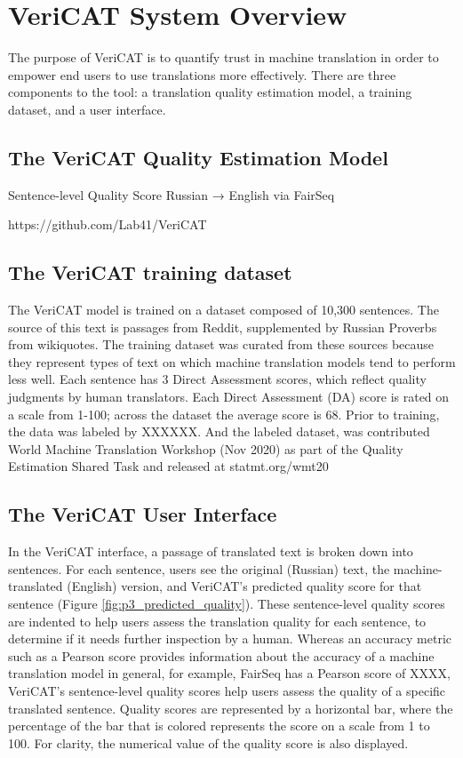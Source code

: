 \section{VeriCAT System Overview}
The purpose of VeriCAT is to quantify trust in machine translation in order to empower end users to use translations more effectively. There are three components to the tool: a  translation quality estimation model, a training dataset, and a user interface.

\subsection{The VeriCAT Quality Estimation Model}

Sentence-level Quality Score
Russian → English via FairSeq

https://github.com/Lab41/VeriCAT

\subsection{The VeriCAT training dataset}
The VeriCAT model is trained on a dataset composed of 10,300 sentences. The source of this text is passages from Reddit, supplemented by Russian Proverbs from wikiquotes. The training dataset was curated from these sources because they represent types of text on which machine translation models tend to perform less well. Each sentence has 3 Direct Assessment scores, which reflect quality judgments by human translators. Each Direct Assessment (DA) score is rated on a scale from 1-100; across the dataset the average score is 68. Prior to training, the data was labeled by XXXXXX. And the labeled dataset, was contributed World Machine Translation Workshop (Nov 2020) as part of the Quality Estimation Shared Task and released at statmt.org/wmt20 

\subsection{The VeriCAT User Interface}
In the VeriCAT interface, a passage of translated text is broken down into sentences. For each sentence, users see the original (Russian) text, the machine-translated (English) version, and VeriCAT’s predicted quality score for that sentence (Figure \ref{fig:p3_predicted_quality}). These sentence-level quality scores are indented to help users assess the translation quality for each sentence, to determine if it needs further inspection by a human. Whereas an accuracy metric such as a Pearson score provides information about the accuracy of a machine translation model in general, for example, FairSeq has a Pearson score of XXXX, VeriCAT’s sentence-level quality scores help users assess the quality of a specific translated sentence. Quality scores are represented by a horizontal bar, where the percentage of the bar that is colored represents the score on a scale from 1 to 100. For clarity, the numerical value of the quality score is also displayed. 

